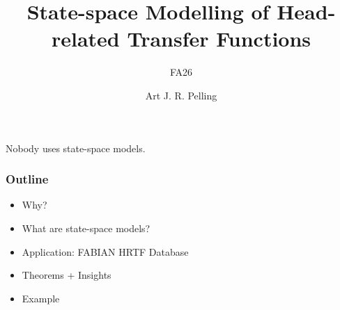 \documentclass{tub-beamer}
\title{State-space Modelling of Head-related Transfer Functions}
\subtitle{FA26}
\author[Art Pelling]{Art J. R. Pelling}
\institute{Department of Engineering Acoustics, TU Berlin}
\begin{document}
%
\begin{frame}
  \maketitle
\end{frame}
%
\begin{frame}
  \centering
  \vfill
  {\LARGE Nobody uses state-space models.\par}
  \vfill
\end{frame}
%
\begin{frame}
  \frametitle{Outline}
  \begin{itemize}
    \item Why?
    \item What are state-space models?
    \item Application: FABIAN HRTF Database
    \item Theorems + Insights
    \item Example
  \end{itemize}
\end{frame}
%
\end{document}
